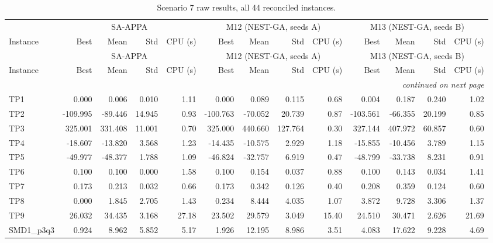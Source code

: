 \begingroup\scriptsize
\begin{longtable}{lrrrrrrrrrrrr}
\caption{Scenario 7 raw results, all 44 reconciled instances.}\label{tab:scenario7}\\
\toprule
 & \multicolumn{4}{c}{SA-APPA} & \multicolumn{4}{c}{M12 (NEST-GA, seeds A)} & \multicolumn{4}{c}{M13 (NEST-GA, seeds B)} \\
\cmidrule(lr){2-5} \cmidrule(lr){6-9} \cmidrule(lr){10-13}
Instance & Best & Mean & Std & CPU (s) & Best & Mean & Std & CPU (s) & Best & Mean & Std & CPU (s) \\
\midrule
\endfirsthead
\toprule
 & \multicolumn{4}{c}{SA-APPA} & \multicolumn{4}{c}{M12 (NEST-GA, seeds A)} & \multicolumn{4}{c}{M13 (NEST-GA, seeds B)} \\
\cmidrule(lr){2-5} \cmidrule(lr){6-9} \cmidrule(lr){10-13}
Instance & Best & Mean & Std & CPU (s) & Best & Mean & Std & CPU (s) & Best & Mean & Std & CPU (s) \\
\midrule
\endhead
\midrule\multicolumn{13}{r}{\emph{continued on next page}}\\\midrule
\endfoot
\bottomrule
\endlastfoot
TP1 & 0.000 & 0.006 & 0.010 & 1.11 & 0.000 & 0.089 & 0.115 & 0.68 & 0.004 & 0.187 & 0.240 & 1.02 \\
TP2 & -109.995 & -89.446 & 14.945 & 0.93 & -100.763 & -70.052 & 20.739 & 0.87 & -103.561 & -66.355 & 20.199 & 0.85 \\
TP3 & 325.001 & 331.408 & 11.001 & 0.70 & 325.000 & 440.660 & 127.764 & 0.30 & 327.144 & 407.972 & 60.857 & 0.60 \\
TP4 & -18.607 & -13.820 & 3.568 & 1.23 & -14.435 & -10.575 & 2.929 & 1.18 & -15.855 & -10.456 & 3.789 & 1.15 \\
TP5 & -49.977 & -48.377 & 1.788 & 1.09 & -46.824 & -32.757 & 6.919 & 0.47 & -48.799 & -33.738 & 8.231 & 0.91 \\
TP6 & 0.100 & 0.100 & 0.000 & 1.58 & 0.100 & 0.154 & 0.037 & 0.88 & 0.100 & 0.143 & 0.034 & 1.41 \\
TP7 & 0.173 & 0.213 & 0.032 & 0.66 & 0.173 & 0.342 & 0.126 & 0.40 & 0.208 & 0.359 & 0.124 & 0.60 \\
TP8 & 0.000 & 1.845 & 2.705 & 1.43 & 0.234 & 8.444 & 4.035 & 1.07 & 3.872 & 9.728 & 3.306 & 1.37 \\
TP9 & 26.032 & 34.435 & 3.168 & 27.18 & 23.502 & 29.579 & 3.049 & 15.40 & 24.510 & 30.471 & 2.626 & 21.69 \\
SMD1\_p3q3 & 0.924 & 8.962 & 5.852 & 5.17 & 1.926 & 12.195 & 8.986 & 3.51 & 4.083 & 17.622 & 9.228 & 4.69 \\

\end{longtable}
